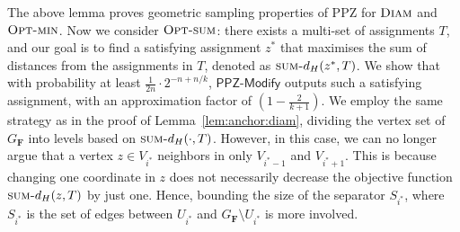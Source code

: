 \documentclass[11pt, letterpaper]{article}
\theoremstyle{definition}
\newcommand{\f}{\mathbf{F}}
\newcommand{\sumd}{\textsc{sum-}d_H}
\newcommand{\opts}{\textsc{Opt-sum}}
\newcommand{\optm}{\textsc{Opt-min}}
\newcommand{\D}{\textsc{Diam}}
\newcommand{\PPZMod}{\textsf{PPZ-Modify}}
\begin{document}
The above lemma proves geometric sampling properties of PPZ for $\D$ and $\optm$. Now we consider $\opts$: there exists a multi-set of assignments $T$, and our goal is to find a satisfying assignment $z^*$ that maximises the sum of distances from the assignments in $T$, denoted as $\sumd(z^*,T)$. We show that with probability at least $\frac{1}{2n} \cdot 2^{-n+n/k}$, $\PPZMod$ outputs such a satisfying assignment, with an approximation factor of $\left(1-\frac{2}{k+1}\right)$. We employ the same strategy as in the proof of Lemma~\ref{lem:anchor:diam}, dividing the vertex set of $G_\f$ into levels based on $\sumd(\cdot, T)$. However, in this case, we can no longer argue that a vertex $z \in V_{i^*}$ neighbors in only $V_{i^*-1}$ and $V_{i^*+1}$. This is because changing one coordinate in $z$ does not necessarily decrease the objective function $\sumd(z, T)$ by just one. Hence, bounding the size of the separator $S_{i^*}$, where $S_{i^*}$ is the set of edges between $U_{i^*}$ and $G_{\f} \setminus U_{i^*}$ is more involved.
\end{document}
